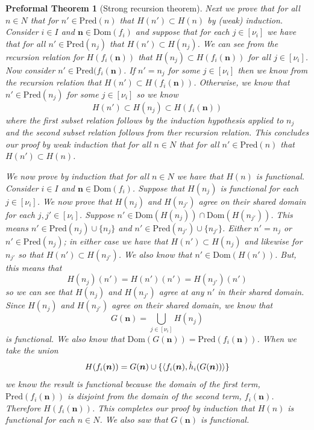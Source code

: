 \documentclass[oneside, 12pt]{book}
\theoremstyle{break}
\newtheorem{preformal definition}[definition]{Preformal Definition}
\newtheorem{preformal theorem}[theorem]{Preformal Theorem}
\newcommand{\bv}[1]{\boldsymbol{#1}}
\begin{document}
\begin{preformal theorem}[Strong recursion theorem]
				Next we prove that for all $n\in N$ that for $n'\in \text{Pred}(n)$ that $H(n') \subset H(n)$ by (weak) induction.
				Consider $i\in I$ and $\bv{n} \in \text{Dom}(f_i)$ and suppose that for each $j \in [\nu_i]$ we have that for all $n' \in \text{Pred}(n_j)$ that $H(n') \subset H(n_j)$.
				We can see from the recursion relation for $H(f_i(\bv{n}))$ that $H(n_j) \subset H(f_i(\bv{n}))$ for all $j\in [\nu_i]$.
				Now consider $n' \in \text{Pred}(f_i(\bv{n})$.
				If $n' = n_j$ for some $j\in [\nu_i]$ then we know from the recursion relation that $H(n') \subset H(f_i(\bv{n}))$.
				Otherwise, we know that $n' \in \text{Pred}(n_j)$ for some $j\in [\nu_i]$ so we know
				\begin{equation*}
					H(n') \subset H(n_j) \subset H(f_i(\bv{n}))
				\end{equation*}
				where the first subset relation follows by the induction hypothesis applied to $n_j$ and the second subset relation follows from ther recursion relation.
				This concludes our proof by weak induction that for all $n\in N$ that for all $n' \in \text{Pred}(n)$ that $H(n') \subset H(n)$.
				
				We now prove by induction that for all $n\in N$ we have that $H(n)$ is functional.
				Consider $i\in I$ and $\bv{n} \in \text{Dom}(f_i)$.
				Suppose that $H(n_j)$ is functional for each $j\in [\nu_i]$.
				We now prove that $H(n_j)$ and $H(n_{j'})$ agree on their shared domain for each $j, j' \in [\nu_i]$.
				Suppose $n' \in \text{Dom}(H(n_j)) \cap \text{Dom}(H(n_{j'}))$.
				This means $n' \in \text{Pred}(n_j)\cup \{n_j\}$ and $n' \in \text{Pred}(n_{j'}) \cup \{n_{j'}\}$.
				Either $n' = n_j$ or $n' \in \text{Pred}(n_j)$; in either case we have that $H(n') \subset H(n_j)$ and likewise for $n_{j'}$ so that $H(n') \subset H(n_{j'})$.
				We also know that $n' \in \text{Dom}(H(n'))$.
				But, this means that 
				\begin{equation*}
					H(n_j)(n') = H(n')(n') = H(n_{j'})(n')
				\end{equation*}
				so we can see that $H(n_j)$ and $H(n_{j'})$ agree at any $n'$ in their shared domain.
				Since $H(n_j)$ and $H(n_{j'})$ agree on their shared domain, we know that
				\begin{equation*}
					G(\bv{n}) = \bigcup_{j\in [\nu_i]} H(n_j)
				\end{equation*}
				is functional.
				We also know that $\text{Dom}(G(\bv{n})) = \text{Pred}(f_i(\bv{n}))$.
				When we take the union
				\begin{equation*}
					H(f_i(\bv{n})) = G(\bv{n}) \cup \{\braket{f_i(\bv{n}), \hat{h}_i(G(\bv{n}))}\}
				\end{equation*}
				we know the result is functional because the domain of the first term, $\text{Pred}(f_i(\bv{n}))$ is disjoint from the domain of the second term, $f_i(\bv{n})$.
				Therefore $H(f_i(\bv{n}))$.
				This completes our proof by induction that $H(n)$ is functional for each $n\in N$.
				We also saw that $G(\bv{n})$ is functional.
				

\end{preformal theorem}
\end{document}
